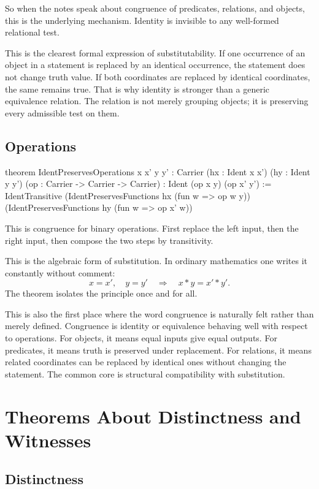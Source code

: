 \documentclass[11pt]{article}
\begin{document}
So when the notes speak about congruence of predicates, relations, and objects, this is the underlying mechanism. Identity is invisible to any well-formed relational test.

This is the clearest formal expression of substitutability. If one occurrence of an object in a statement is replaced by an identical occurrence, the statement does not change truth value. If both coordinates are replaced by identical coordinates, the same remains true. That is why identity is stronger than a generic equivalence relation. The relation is not merely grouping objects; it is preserving every admissible test on them.

\subsection{Operations}

\begin{leanblock}
theorem IdentPreservesOperations {x x' y y' : Carrier}
    (hx : Ident x x') (hy : Ident y y') (op : Carrier -> Carrier -> Carrier) :
    Ident (op x y) (op x' y') :=
  IdentTransitive
    (IdentPreservesFunctions hx (fun w => op w y))
    (IdentPreservesFunctions hy (fun w => op x' w))
\end{leanblock}

This is congruence for binary operations. First replace the left input, then the right input, then compose the two steps by transitivity.

This is the algebraic form of substitution. In ordinary mathematics one writes it constantly without comment:
\[
x = x', \quad y = y' \quad \Longrightarrow \quad x \ast y = x' \ast y'.
\]
The theorem isolates the principle once and for all.

This is also the first place where the word congruence is naturally felt rather than merely defined. Congruence is identity or equivalence behaving well with respect to operations. For objects, it means equal inputs give equal outputs. For predicates, it means truth is preserved under replacement. For relations, it means related coordinates can be replaced by identical ones without changing the statement. The common core is structural compatibility with substitution.

\section{Theorems About Distinctness and Witnesses}

\subsection{Distinctness}
\end{document}
